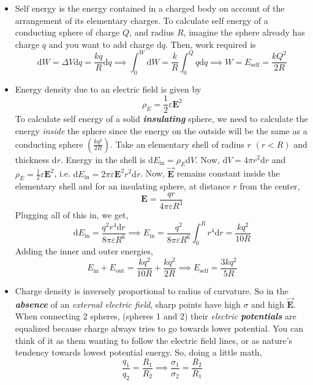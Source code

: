 \documentclass{scrartcl}
\begin{document}
\begin{itemize}
        \item Self energy is the energy contained in a charged body on account of the arrangement of its elementary charges. To calculate self energy of a conducting sphere of charge $Q$, and radius $R$, imagine the sphere already has charge $q$ and you want to add charge $\mathrm dq$. Then, work required is \[\mathrm dW=\Delta V\mathrm dq=\frac{kq}R\mathrm dq\implies\int_0^W\mathrm dW=\frac kR\int_0^Qq\mathrm dq\implies W=\boxed{E_\text{self}=\frac{kQ^2}{2R}}\]
        \item Energy density due to an electric field is given by \[\boxed{\rho_E=\frac12\varepsilon{\mathbf E}^2}\] To calculate self energy of a solid \textbf{\textit{insulating}} sphere, we need to calculate the energy \textit{inside} the sphere since the energy on the outside will be the same as a conducting sphere $\left(\frac{kq^2}{2R}\right)$. Take an elementary shell of radius $r$ $(r<R)$ and thickness $\mathrm dr$. Energy in the shell is $\mathrm dE_\text{in}=\rho_E\mathrm dV$. Now, $\mathrm dV=4\pi r^2\mathrm dr$ and \newline$\rho_E=\frac12\varepsilon{\mathbf E}^2$, i.e. $\mathrm dE_\text{in}=2\pi\varepsilon{\mathbf E}^2r^2\mathrm dr$. Now, $\vec{\mathbf E}$ remains constant inside the elementary shell and for an insulating sphere, at distance $r$ from the center, \[\mathbf E=\frac{qr}{4\pi\varepsilon R^3}\] Plugging all of this in, we get, \[\mathrm dE_\text{in}=\frac{q^2r^4\mathrm dr}{8\pi\varepsilon R^6}\implies E_\text{in}=\frac{q^2}{8\pi\varepsilon R^6}\int_0^Rr^4\mathrm dr=\frac{kq^2}{10R}\] Adding the inner and outer energies, \[E_\text{in}+E_\text{out}=\frac{kq^2}{10R}+\frac{kq^2}{2R}\implies\boxed{E_\text{self}=\frac{3kq^2}{5R}}\]
        \item Charge density is inversely proportional to radius of curvature. So in the \textit{\textbf{absence}} of an \textit{external electric field}, sharp points have high $\sigma$ and high $\vec{\mathbf E}$. When connecting 2 spheres, (spheres 1 and 2) their \textit{electric \textbf{potentials}} are equalized because charge always tries to go towards lower potential. You can think of it as them wanting to follow the electric field lines, or as nature's tendency towards lowest potential energy. So, doing a little math, \[\boxed{\frac{q_1}{q_2}=\frac{R_1}{R_2}\implies\frac{\sigma_1}{\sigma_2}=\frac{R_2}{R_1}}\]
    \end{itemize}
\end{document}
